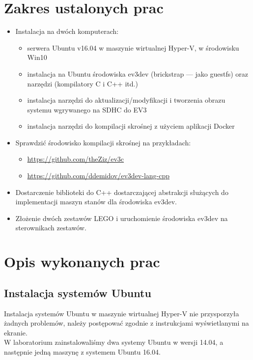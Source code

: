 \documentclass{article}
\begin{document}
\section{Zakres ustalonych prac}
\begin{itemize}
    \item Instalacja na dwóch komputerach:
        \begin{itemize}
            \item serwera Ubuntu v16.04 w maszynie wirtualnej Hyper-V, w środowisku Win10
            \item instalacja na Ubuntu środowiska ev3dev (brickstrap --- jako guestfs) oraz narzędzi (kompilatory C i C++ itd.)
            \item instalacja narzędzi do aktualizacji/modyfikacji i tworzenia obrazu systemu wgrywanego na SDHC do EV3
            \item instalacja narzędzi do kompilacji skrośnej z użyciem aplikacji Docker
        \end{itemize}
    \item Sprawdzić środowisko kompilacji skrośnej na przykładach:
        \begin{itemize}
            \item \url{https://github.com/theZiz/ev3c}
            \item \url{https://github.com/ddemidov/ev3dev-lang-cpp}
        \end{itemize}
    \item Dostarczenie biblioteki do C++ dostarczającej abstrakcji służących do
        implementacji maszyn stanów dla środowiska ev3dev.
    \item Złożenie dwóch zestawów LEGO i uruchomienie środowiska ev3dev na
        sterownikach zestawów.
\end{itemize}
\section{Opis wykonanych prac}
\subsection{Instalacja systemów Ubuntu}
Instalacja systemów Ubuntu w maszynie wirtualnej Hyper-V nie przysporzyła
żadnych problemów, należy postępować zgodnie z instrukcjami wyświetlanymi na
ekranie.\\
W laboratorium zainstalowaliśmy dwa systemy Ubuntu w wersji 14.04, a następnie
jedną maszynę z systemem Ubuntu 16.04.
\end{document}
